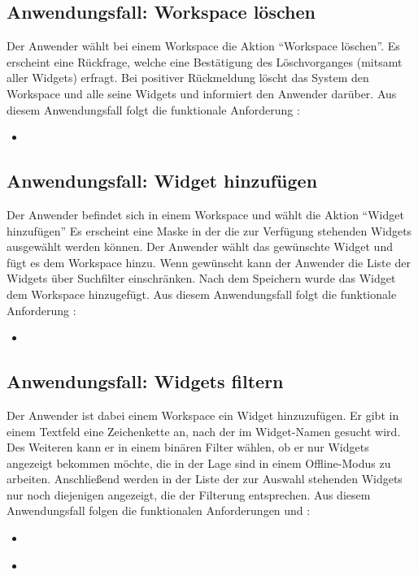 \subsection{Anwendungsfall: Workspace löschen}
Der Anwender wählt bei einem Workspace die Aktion "`Workspace löschen"'. Es erscheint eine Rückfrage, welche eine Bestätigung des Löschvorganges (mitsamt aller Widgets) erfragt. Bei positiver Rückmeldung löscht das System den Workspace und alle seine Widgets und informiert den Anwender darüber. Aus diesem Anwendungsfall folgt die funktionale Anforderung :
\begin{itemize}
 \item \requirementf{\requirementWorkspaceDelete}\label{requirementWorkspaceDelete}
\end{itemize}

\subsection{Anwendungsfall: Widget hinzufügen}
Der Anwender befindet sich in einem Workspace und wählt die Aktion "`Widget hinzufügen"' Es erscheint eine Maske in der die zur Verfügung stehenden Widgets ausgewählt werden können. Der Anwender wählt das gewünschte Widget und fügt es dem Workspace hinzu. Wenn gewünscht kann der Anwender die Liste der Widgets über Suchfilter einschränken. Nach dem Speichern wurde das Widget dem Workspace hinzugefügt. Aus diesem Anwendungsfall folgt die funktionale Anforderung :
\begin{itemize}
 \item \requirementf{\requirementWidgetAdd}\label{requirementWidgetAdd}
\end{itemize}

\subsection{Anwendungsfall: Widgets filtern}
Der Anwender ist dabei einem Workspace ein Widget hinzuzufügen. Er gibt in einem Textfeld eine Zeichenkette an, nach der im Widget-Namen gesucht wird. Des Weiteren kann er in einem binären Filter wählen, ob er nur Widgets angezeigt bekommen möchte, die in der Lage sind in einem Offline-Modus zu arbeiten. Anschließend werden in der Liste der zur Auswahl stehenden Widgets nur noch diejenigen angezeigt, die der Filterung entsprechen. Aus diesem Anwendungsfall folgen die funktionalen Anforderungen  und :
\begin{itemize}
 \item \requirementf{\requirementWidgetFilterName}\label{requirementWidgetFilterName}
 \item \requirementf{\requirementWidgetFilterOnline}\label{requirementWidgetFilterOnline}
\end{itemize}
 
